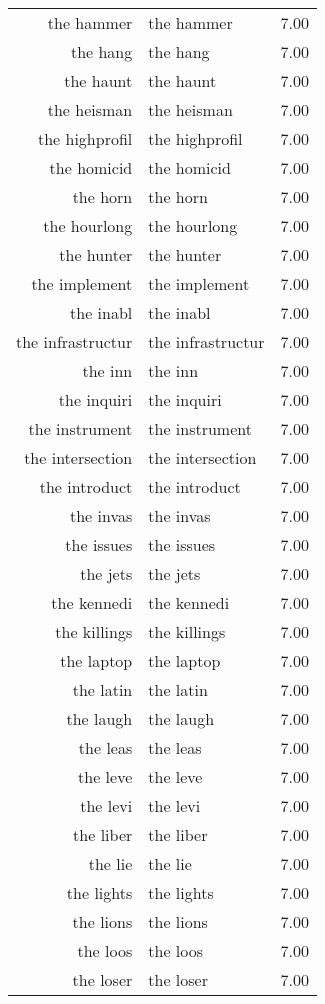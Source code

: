 \begin{table}[ht]
\begin{tabular}{rlr}
  the hammer & the hammer & 7.00 \\ 
  the hang & the hang & 7.00 \\ 
  the haunt & the haunt & 7.00 \\ 
  the heisman & the heisman & 7.00 \\ 
  the highprofil & the highprofil & 7.00 \\ 
  the homicid & the homicid & 7.00 \\ 
  the horn & the horn & 7.00 \\ 
  the hourlong & the hourlong & 7.00 \\ 
  the hunter & the hunter & 7.00 \\ 
  the implement & the implement & 7.00 \\ 
  the inabl & the inabl & 7.00 \\ 
  the infrastructur & the infrastructur & 7.00 \\ 
  the inn & the inn & 7.00 \\ 
  the inquiri & the inquiri & 7.00 \\ 
  the instrument & the instrument & 7.00 \\ 
  the intersection & the intersection & 7.00 \\ 
  the introduct & the introduct & 7.00 \\ 
  the invas & the invas & 7.00 \\ 
  the issues & the issues & 7.00 \\ 
  the jets & the jets & 7.00 \\ 
  the kennedi & the kennedi & 7.00 \\ 
  the killings & the killings & 7.00 \\ 
  the laptop & the laptop & 7.00 \\ 
  the latin & the latin & 7.00 \\ 
  the laugh & the laugh & 7.00 \\ 
  the leas & the leas & 7.00 \\ 
  the leve & the leve & 7.00 \\ 
  the levi & the levi & 7.00 \\ 
  the liber & the liber & 7.00 \\ 
  the lie & the lie & 7.00 \\ 
  the lights & the lights & 7.00 \\ 
  the lions & the lions & 7.00 \\ 
  the loos & the loos & 7.00 \\ 
  the loser & the loser & 7.00 \\ 

\end{tabular}
\end{table}

